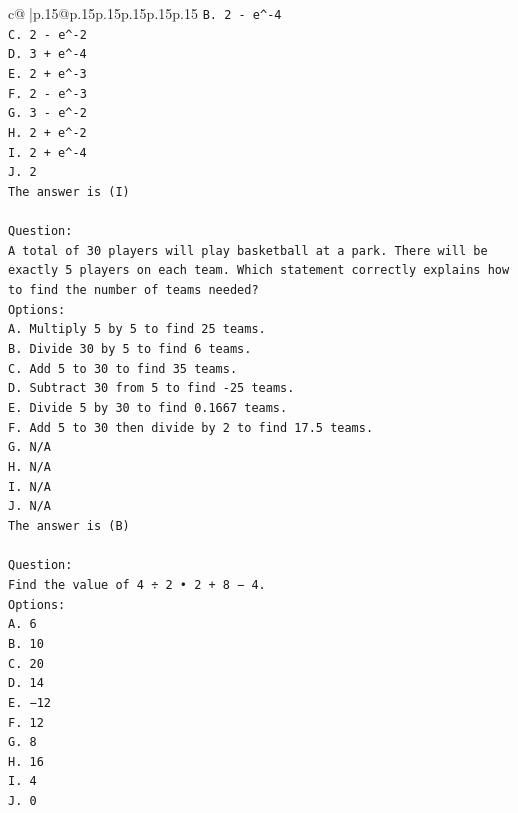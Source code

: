 \documentclass{article}
\begin{document}
{\begin{supertabular}{c@{$\;$}|p{.15\linewidth}@{}p{.15\linewidth}p{.15\linewidth}p{.15\linewidth}p{.15\linewidth}p{.15\linewidth}}
{{{\texttt{B. 2 {-} e\^{}{-}4} \\
\texttt{C. 2 {-} e\^{}{-}2} \\
\texttt{D. 3 + e\^{}{-}4} \\
\texttt{E. 2 + e\^{}{-}3} \\
\texttt{F. 2 {-} e\^{}{-}3} \\
\texttt{G. 3 {-} e\^{}{-}2} \\
\texttt{H. 2 + e\^{}{-}2} \\
\texttt{I. 2 + e\^{}{-}4} \\
\texttt{J. 2} \\
\texttt{The answer is (I)} \\
\\ 
\texttt{Question:} \\
\texttt{A total of 30 players will play basketball at a park. There will be exactly 5 players on each team. Which statement correctly explains how to find the number of teams needed?} \\
\texttt{Options:} \\
\texttt{A. Multiply 5 by 5 to find 25 teams.} \\
\texttt{B. Divide 30 by 5 to find 6 teams.} \\
\texttt{C. Add 5 to 30 to find 35 teams.} \\
\texttt{D. Subtract 30 from 5 to find {-}25 teams.} \\
\texttt{E. Divide 5 by 30 to find 0.1667 teams.} \\
\texttt{F. Add 5 to 30 then divide by 2 to find 17.5 teams.} \\
\texttt{G. N/A} \\
\texttt{H. N/A} \\
\texttt{I. N/A} \\
\texttt{J. N/A} \\
\texttt{The answer is (B)} \\
\\ 
\texttt{Question:} \\
\texttt{Find the value of 4 ÷ 2 • 2 + 8 − 4.} \\
\texttt{Options:} \\
\texttt{A. 6} \\
\texttt{B. 10} \\
\texttt{C. 20} \\
\texttt{D. 14} \\
\texttt{E. −12} \\
\texttt{F. 12} \\
\texttt{G. 8} \\
\texttt{H. 16} \\
\texttt{I. 4} \\
\texttt{J. 0} \\
            }
        }
    }
     \\ \\


\end{supertabular}}
\end{document}
